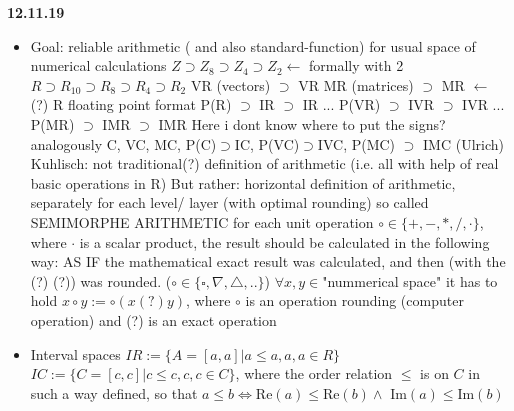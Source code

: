 \documentclass[a4paper, 11pt]{report}
\theoremstyle{break}
\theoremstyle{proofstyle}
\begin{document}
\newline \textbf{12.11.19}
\newline \begin{itemize}
    \item Goal: reliable arithmetic ( and also standard-function) for usual space of numerical calculations
    \newline $Z\supset Z_8\supset Z_4 \supset Z_2 \gets$ formally with 2 
    \newline $R \supset R_10 \supset R_8 \supset R_4 \supset R_2$
    \newline VR (vectors) $\supset $ VR
    \newline MR (matrices) $\supset $ MR $\gets $ (?) R \to floating point format
    \newline P(R) $\supset $ IR $\supset $ IR ...
    \newline P(VR) $\supset $ IVR $\supset $ IVR ...
    \newline P(MR) $\supset $ IMR $\supset $ IMR
    \newline Here i dont know where to put the signs?
    \newline analogously C, VC, MC, P(C)$\supset $IC, P(VC)$\supset $IVC, P(MC) $\supset $ IMC
    \newline (Ulrich) Kuhlisch: not traditional(?) definition of arithmetic (i.e. all with help of real basic operations in R)
    But rather: horizontal definition of arithmetic, separately for each level/ layer (with optimal rounding) 
    \newline \implies so called SEMIMORPHE ARITHMETIC
    \newline for each unit operation $\circ\in \{+,-, *,/,\cdot\}$, where $\cdot$ is a scalar product, the result should be calculated in the following way:
    \newline AS IF the mathematical exact result was calculated, and then (with the (?) (?)) was rounded. ($\circ \in \{\square, \nabla, \triangle,..\}$)
    \newline $\forall x,y\in $"nummerical space" it has to hold $x\circ y:=\circ(x(?)y)$, where $\circ$ is an operation rounding (computer operation) and (?) is an exact operation
    \item Interval spaces
    \newline \to $IR:=\{A=[a,a]| a\leqslant a, a,a \in R\}$
    \newline \to $IC:=\{C=[c,c]| c\leqslant c, c,c\in C\}$, where the order relation $\leqslant$ is on $C$ in such a way defined, so that $a\leqslant b \iff $Re$(a)\leqslant $Re$(b) \land$ Im$(a)\leqslant $Im$(b)$ \smallskip

\end{itemize}
\end{document}
